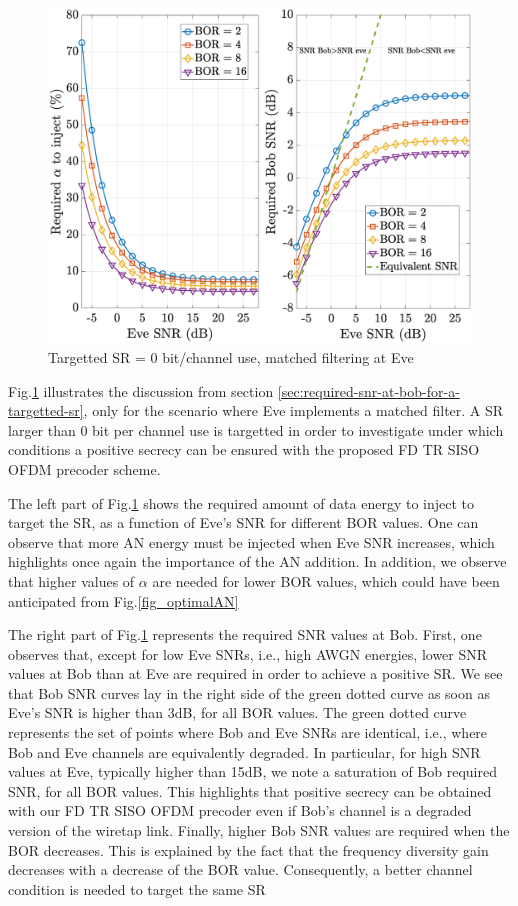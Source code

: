 \documentclass[journal,comsoc]{IEEEtran}
\let\MYoriglatexcaption\caption
\renewcommand{\caption}[2][\relax]{\MYoriglatexcaption[#2]{#2}}
\begin{document}
\begin{figure}[h!t]
	\centering
	\includegraphics[width=1\linewidth]{graphs/SISO_no_corr_targettedSR_0_model2.eps}
	\caption{Targetted SR = 0 bit/channel use, matched filtering at Eve}
	\label{fig_targettedSR}
\end{figure} 
Fig.\ref{fig_targettedSR} illustrates the discussion from section \ref{sec:required-snr-at-bob-for-a-targetted-sr}, only for the scenario where Eve implements a matched filter. A SR larger than 0 bit per channel use is targetted in order to investigate under which conditions a positive secrecy can be ensured with the proposed FD TR SISO OFDM precoder scheme.

The left part of Fig.\ref{fig_targettedSR} shows the required amount of data energy to inject to target the SR, as a function of Eve's SNR for different BOR values. One can observe that more AN energy must be injected when Eve SNR increases, which highlights once again  the importance of the AN addition. In addition, we observe that higher values of $\alpha$ are needed for lower BOR values, which could have been anticipated from Fig.\ref{fig_optimalAN}

The right part of Fig.\ref{fig_targettedSR} represents the required SNR values at Bob. First, one observes that, except for low Eve SNRs, i.e., high AWGN energies, lower SNR values at Bob than at Eve are required in order to achieve a positive SR. We see that Bob SNR curves lay in the right side of the green dotted curve as soon as Eve's SNR is higher than 3dB, for all BOR values. The green dotted curve represents the set of points where Bob and Eve SNRs are identical, i.e., where Bob and Eve channels are equivalently degraded. In particular, for high SNR values at Eve, typically higher than 15dB, we note a saturation of Bob required SNR, for all BOR values. This highlights that positive secrecy can be obtained with our FD TR SISO OFDM precoder even if Bob's channel is a degraded version of the wiretap link. Finally, higher Bob SNR values are required when the BOR decreases. This is explained by the fact that the frequency diversity gain decreases with a decrease of the BOR value. Consequently, a better channel condition is needed to target the same SR 
\end{document}
